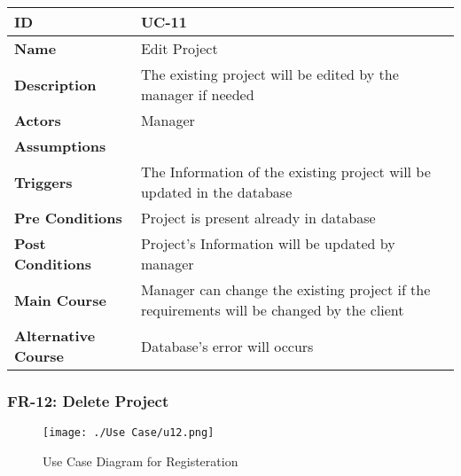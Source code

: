     \begin{center}
        \begin{tabularx}{\textwidth}{|l|X|}
            \hline
            \textbf{ID} & UC-11 \\
            \hline
            \textbf{Name} & Edit Project \\
            \hline
            \textbf{Description} & The existing project will be edited by the manager if needed  \\
            \hline
            \textbf{Actors} & Manager \\
            \hline
            \textbf{Assumptions} &  \\
            \hline
            \textbf{Triggers} & The Information of the existing project will be updated in the database \\
            \hline
            \textbf{Pre Conditions} & Project is present already in database \\
            \hline
            \textbf{Post Conditions} & Project's Information will be updated by manager \\
            \hline
            \textbf{Main Course} & Manager can change the existing project if the requirements will be changed by the client \\
            \hline
            \textbf{Alternative Course} & Database's error will occurs \\
            \hline
            
        \end{tabularx}
    \end{center}
    \newpage
    

    \subsubsection{FR-12: Delete Project}
    \begin{figure}[H]
        \texttt{[image: ./Use Case/u12.png]}
        \centering 
        \caption{Use Case Diagram for Registeration}
        \label{fig:prototype1}
        \end{figure}
        
